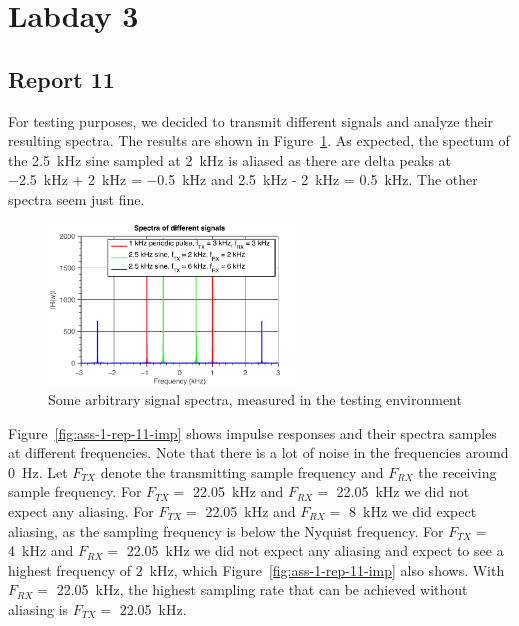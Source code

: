 \documentclass[11pt,titlepage]{report}
\begin{document}
\section{Labday 3}
\subsection{Report 11}
For testing purposes, we decided to transmit different signals and analyze their resulting spectra. The results are shown in Figure~\ref{fig:ass-1-rep-11}. As expected, the spectum of the \SI{2.5}{kHz} sine sampled at \SI{2}{kHz} is aliased as there are delta peaks at \SI{-2.5}{kHz} + \SI{2}{kHz} = \SI{-0.5}{kHz} and \SI{2.5}{kHz} - \SI{2}{kHz} = \SI{0.5}{kHz}. The other spectra seem just fine.

\begin{figure}[H]
	\centering
	\includegraphics[width=0.6\textwidth]{../../deliverable-7-resources/figures/ass-1/report-11-12-13/ass-1-report-11-random-signals.pdf}
	\caption{Some arbitrary signal spectra, measured in the testing environment}
	\label{fig:ass-1-rep-11}
\end{figure}

Figure~\ref{fig:ass-1-rep-11-imp} shows impulse responses and their spectra samples at different frequencies. Note that there is a lot of noise in the frequencies around \SI{0}{Hz}. Let $F_{TX}$ denote the transmitting sample frequency and $F_{RX}$ the receiving sample frequency. For $F_{TX} =$ \SI{22.05}{kHz} and $F_{RX} =$ \SI{22.05}{kHz} we did not expect any aliasing. For $F_{TX} =$ \SI{22.05}{kHz} and $F_{RX} =$ \SI{8}{kHz} we did expect aliasing, as the sampling frequency is below the Nyquist frequency. For $F_{TX} =$ \SI{4}{kHz} and $F_{RX} =$ \SI{22.05}{kHz} we did not expect any aliasing and expect to see a highest frequency of \SI{2}{kHz}, which Figure~\ref{fig:ass-1-rep-11-imp} also shows. With $F_{RX} =$ \SI{22.05}{kHz}, the highest sampling rate that can be achieved without aliasing is $F_{TX} =$ \SI{22.05}{kHz}.
\end{document}
